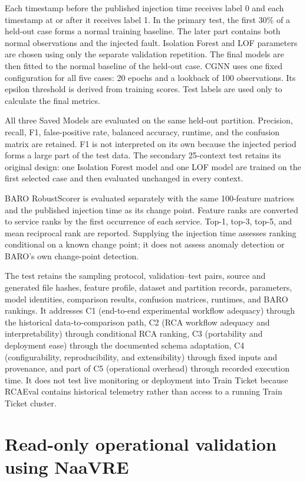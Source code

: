Each timestamp before the published injection time receives label 0 and each timestamp at or after it receives label 1. In the primary test, the first 30\% of a held-out case forms a normal training baseline. The later part contains both normal observations and the injected fault. Isolation Forest and LOF parameters are chosen using only the separate validation repetition. The final models are then fitted to the normal baseline of the held-out case. CGNN uses one fixed configuration for all five cases: 20 epochs and a lookback of 100 observations. Its epsilon threshold is derived from training scores. Test labels are used only to calculate the final metrics.

All three Saved Models are evaluated on the same held-out partition. Precision, recall, F1, false-positive rate, balanced accuracy, runtime, and the confusion matrix are retained. F1 is not interpreted on its own because the injected period forms a large part of the test data. The secondary 25-context test retains its original design: one Isolation Forest model and one LOF model are trained on the first selected case and then evaluated unchanged in every context.

BARO RobustScorer is evaluated separately with the same 100-feature matrices and the published injection time as its change point. Feature ranks are converted to service ranks by the first occurrence of each service. Top-1, top-3, top-5, and mean reciprocal rank are reported. Supplying the injection time assesses ranking conditional on a known change point; it does not assess anomaly detection or BARO's own change-point detection.

The test retains the sampling protocol, validation--test pairs, source and generated file hashes, feature profile, dataset and partition records, parameters, model identities, comparison results, confusion matrices, runtimes, and BARO rankings. It addresses C1 (end-to-end experimental workflow adequacy) through the historical data-to-comparison path, C2 (RCA workflow adequacy and interpretability) through conditional RCA ranking, C3 (portability and deployment ease) through the documented schema adaptation, C4 (configurability, reproducibility, and extensibility) through fixed inputs and provenance, and part of C5 (operational overhead) through recorded execution time. It does not test live monitoring or deployment into Train Ticket because RCAEval contains historical telemetry rather than access to a running Train Ticket cluster.

\section{Read-only operational validation using NaaVRE}
\label{sec:naavre_protocol}

